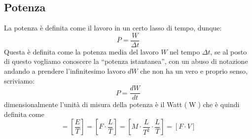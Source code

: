         \subsection{Potenza}
            La potenza è definita come il lavoro in un certo lasso di tempo, dunque:
            \begin{equation}
                \overline{P}=\frac{W}{\Delta t}
            \end{equation}
            Questa è definita come la potenza media del lavoro $W$ nel tempo $\Delta t$, se al posto di questo vogliamo conoscere la ``potenza istantanea'', con un abuso di notazione andando a prendere l'infinitesimo lavoro $dW$ che non ha un vero e proprio senso, scriviamo:
            \begin{equation}
                P=\frac{dW}{dt}
            \end{equation}
            dimensionalmente l'unità di misura della potenza è il Watt ($\operatorname{W}$) che è quindi definita come
            \begin{equation*}
                [P]=\left[\frac{E}{T}\right]=\left[F\cdot\frac{L}{T}\right]=\left[M\cdot\frac{L}{T^2}\cdot\frac{L}{T}\right]=\left[F\cdot V\right]
            \end{equation*}